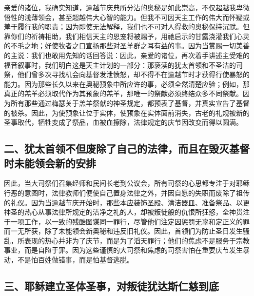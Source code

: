 亲爱的诸位，我确实知道，逾越节庆典所分沾的奥秘是如此崇高，不仅超越我卑微悟性的浅薄领会，甚至超越伟大心智的能力。但我不可因天主工作的伟大而怀疑或羞于履行我的职责；因为即使无法解释，我们也不可对人得救的奥秘保持沉默。但靠你们的祈祷相助，我们相信天主的恩宠将被赐予，用祂启示的甘露浇灌我们心灵的不毛之地；好使牧者之口宣扬那些对圣羊群之耳有益的事。因为当赏赐一切美善的主说：我们也敢用先知的话回答说：因此，亲爱的诸位，再次着手讲述主受难的福音叙事时，我们明白这是天主计划的一部分：那亵渎的犹太首领和不圣洁的司祭，他们曾多次寻找机会向基督发泄愤怒，却不得不在逾越节时才获得行使暴怒的能力。因为那些长久以来在奥秘预象中所应许的事，必须全然清楚应验；例如，那真正的羔羊必须取代作为其预象的羔羊，那唯一的祭献必须终结众多不同祭献。因为所有那些通过梅瑟关于羔羊祭献的神圣规定，都预表了基督，并真实宣告了基督的被杀。因此，为使预象让位于实体，使预象在实体面前消失，古老的礼规被新的圣事取代，牺牲变成了祭品，血被血擦除，法律规定的庆节因改变而得以圆满。\par


\subsection{二、犹太首领不但废除了自己的法律，而且在毁灭基督时未能领会新的安排}

因此，当大司祭们召集经师和民间长老到公议会，所有司祭的心思都专注于对耶稣行恶的意图时，法律教师们便使自己置身法律之外，并因自愿的失职而废除了祖传的礼仪。因为当逾越节庆开始时，那些本应装饰圣殿、清洁器皿、准备祭品、以更神圣的热心从事法律所规定的洁净之礼的人，却被叛徒般的仇恨所狂怒，全神贯注于一项工作，以一致的残酷图谋同一罪行，尽管他们注定因惩罚无辜和定正义的罪而一无所获，除了未能领会新奥秘和违反旧礼仪。因此，首领们为防止圣日发生骚乱，所表现的热心并非为了庆节，而是为了滔天罪行；他们的焦虑不是服务于宗教事业，而是自陷于罪。因为这些谨慎的大司祭和焦虑的司祭害怕在重要庆节发生暴动，不是怕百姓做错事，而是怕基督逃脱。\par


\subsection{三、耶稣建立圣体圣事，对叛徒犹达斯仁慈到底}


